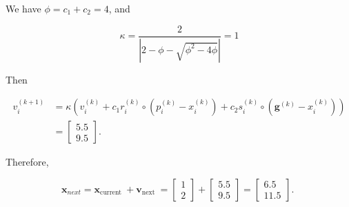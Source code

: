 We have \(\phi=c_{1}+c_{2}=4\), and

\[
	\kappa=\frac{2}{\left|2-\phi-\sqrt{\phi^{2}-4 \phi}\right|}=1
\]

Then

\[
	\begin{aligned}
		v_{i}^{(k+1)} & =\kappa\left(v_{i}^{(k)}+c_{1} r_{i}^{(k)} \circ\left(p_{i}^{(k)}-x_{i}^{(k)}\right)+c_{2} s_{i}^{(k)} \circ\left(\boldsymbol{g}^{(k)}-x_{i}^{(k)}\right)\right) \\
		& =\left[\begin{array}{l}
			5.5 \\
			9.5
		\end{array}\right] .
	\end{aligned}
\]

Therefore,

\[
	\boldsymbol{x}_{n e x t}=\boldsymbol{x}_{\text {current }}+\boldsymbol{v}_{\text {next }}=\left[\begin{array}{l}
		1 \\
		2
	\end{array}\right]+\left[\begin{array}{l}
		5.5 \\
		9.5
	\end{array}\right]=\left[\begin{array}{c}
		6.5 \\
		11.5
	\end{array}\right] \text {. }
\]
